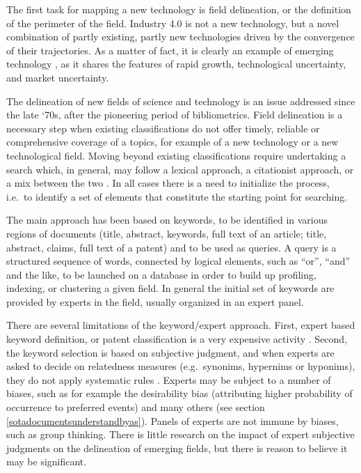 \documentclass[b5paper,]{book}
\theoremstyle{definition}
\theoremstyle{definition}
\theoremstyle{definition}
\theoremstyle{remark}
\begin{document}
The first task for mapping a new technology is field delineation, or the
definition of the perimeter of the field. Industry 4.0 is not a new
technology, but a novel combination of partly existing, partly new
technologies driven by the convergence of their trajectories. As a
matter of fact, it is clearly an example of emerging technology
\citep{rotolo2015emerging}, as it shares the features of rapid growth,
technological uncertainty, and market uncertainty.

The delineation of new fields of science and technology is an issue
addressed since the late `70s, after the pioneering period of
bibliometrics. Field delineation is a necessary step when existing
classifications do not offer timely, reliable or comprehensive coverage
of a topics, for example of a new technology or a new technological
field. Moving beyond existing classifications require undertaking a
search which, in general, may follow a lexical approach, a citationist
approach, or a mix between the two
\citep{small2006tracking, kreuchauff2017patent}. In all cases there is a
need to initialize the process, i.e.~to identify a set of elements that
constitute the starting point for searching.

The main approach has been based on keywords, to be identified in
various regions of documents (title, abstract, keywords, full text of an
article; title, abstract, claims, full text of a patent) and to be used
as queries. A query is a structured sequence of words, connected by
logical elements, such as ``or'', ``and'' and the like, to be launched
on a database in order to build up profiling, indexing, or clustering a
given field. In general the initial set of keywords are provided by
experts in the field, usually organized in an expert panel.

There are several limitations of the keyword/expert approach. First,
expert based keyword definition, or patent classification is a very
expensive activity \citep{tseng2007text}. Second, the keyword selection
is based on subjective judgment, and when experts are asked to decide on
relatedness measures (e.g.~synonims, hypernims or hyponims), they do not
apply systematic rules \citep[\citet{noh2015keyword}]{tseng2007text}.
Experts may be subject to a number of biases, such as for example the
desirability bias (attributing higher probability of occurrence to
preferred events) and many others (see section
\ref{sotadocumentsunderstandbyas}). Panels of experts are not immune by
biases, such as group thinking. There is little research on the impact
of expert subjective judgments on the delineation of emerging fields,
but there is reason to believe it may be significant.
\end{document}
